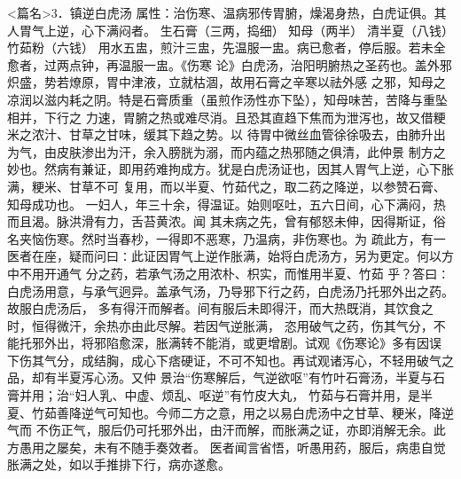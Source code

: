 \documentclass[a4paper,12pt,UTF8,twoside]{ctexbook}
\begin{document}
<篇名>3．镇逆白虎汤
属性：治伤寒、温病邪传胃腑，燥渴身热，白虎证俱。其人胃气上逆，心下满闷者。 
生石膏（三两，捣细） 知母（两半） 清半夏（八钱） 竹茹粉（六钱） 
用水五盅，煎汁三盅，先温服一盅。病已愈者，停后服。若未全愈者，过两点钟，再温服一盅。《伤寒 
论》白虎汤，治阳明腑热之圣药也。盖外邪炽盛，势若燎原，胃中津液，立就枯涸，故用石膏之辛寒以祛外感 
之邪，知母之凉润以滋内耗之阴。特是石膏质重（虽煎作汤性亦下坠），知母味苦，苦降与重坠相并，下行之 
力速，胃腑之热或难尽消。且恐其直趋下焦而为泄泻也，故又借粳米之浓汁、甘草之甘味，缓其下趋之势。以 
待胃中微丝血管徐徐吸去，由肺升出为气，由皮肤渗出为汗，余入膀胱为溺，而内蕴之热邪随之俱清，此仲景 
制方之妙也。然病有兼证，即用药难拘成方。犹是白虎汤证也，因其人胃气上逆，心下胀满，粳米、甘草不可 
复用，而以半夏、竹茹代之，取二药之降逆，以参赞石膏、知母成功也。 
一妇人，年三十余，得温证。始则呕吐，五六日间，心下满闷，热而且渴。脉洪滑有力，舌苔黄浓。闻 
其未病之先，曾有郁怒未伸，因得斯证，俗名夹恼伤寒。然时当春杪，一得即不恶寒，乃温病，非伤寒也。为 
疏此方，有一医者在座，疑而问曰∶此证因胃气上逆作胀满，始将白虎汤方，另为更定。何以方中不用开通气 
分之药，若承气汤之用浓朴、枳实，而惟用半夏、竹茹 
乎？答曰∶白虎汤用意，与承气迥异。盖承气汤，乃导邪下行之药，白虎汤乃托邪外出之药。故服白虎汤后， 
多有得汗而解者。间有服后未即得汗，而大热既消，其饮食之时，恒得微汗，余热亦由此尽解。若因气逆胀满， 
恣用破气之药，伤其气分，不能托邪外出，将邪陷愈深，胀满转不能消，或更增剧。试观《伤寒论》多有因误 
下伤其气分，成结胸，成心下痞硬证，不可不知也。再试观诸泻心，不轻用破气之品，却有半夏泻心汤。又仲 
景治“伤寒解后，气逆欲呕”有竹叶石膏汤，半夏与石膏并用；治“妇人乳、中虚、烦乱、呕逆”有竹皮大丸， 
竹茹与石膏并用，是半夏、竹茹善降逆气可知也。今师二方之意，用之以易白虎汤中之甘草、粳米，降逆气而 
不伤正气，服后仍可托邪外出，由汗而解，而胀满之证，亦即消解无余。此方愚用之屡矣，未有不随手奏效者。 
医者闻言省悟，听愚用药，服后，病患自觉胀满之处，如以手推排下行，病亦遂愈。 
\end{document}
